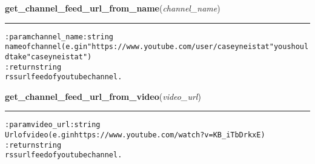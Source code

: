     \label{hal:internet:youtube:get_channel_feed_url_from_name}

    \vspace{0.5ex}

\hspace{.8\funcindent}\begin{boxedminipage}{\funcwidth}

    \raggedright \textbf{get\_channel\_feed\_url\_from\_name}(\textit{channel\_name})

    \vspace{-1.5ex}

    \rule{\textwidth}{0.5\fboxrule}
\setlength{\parskip}{2ex}
\begin{alltt}

:param channel\_name: string
    name of channel (e.g in "https://www.youtube.com/user/caseyneistat" you should take "caseyneistat")
:return string
    rss url feed of youtube channel.
\end{alltt}

\setlength{\parskip}{1ex}
    \end{boxedminipage}

    \label{hal:internet:youtube:get_channel_feed_url_from_video}

    \vspace{0.5ex}

\hspace{.8\funcindent}\begin{boxedminipage}{\funcwidth}

    \raggedright \textbf{get\_channel\_feed\_url\_from\_video}(\textit{video\_url})

    \vspace{-1.5ex}

    \rule{\textwidth}{0.5\fboxrule}
\setlength{\parskip}{2ex}
\begin{alltt}

:param video\_url: string
    Url of video (e.g in https://www.youtube.com/watch?v=KB\_iTbDrkxE)
:return string
    rss url feed of youtube channel.
\end{alltt}

\setlength{\parskip}{1ex}
    \end{boxedminipage}


